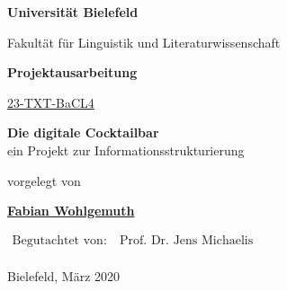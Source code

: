 \begin{center}

\Huge{\textbf{Universität Bielefeld}}

\LARGE{Fakultät für Linguistik und Literaturwissenschaft}

\vfill

\LARGE{\textbf{Projektausarbeitung}}

\Large

\href{https://ekvv.uni-bielefeld.de/sinfo/publ/modul/26802491}{23-TXT-BaCL4}

\vfill


\vspace*{1cm}

\LARGE{\textbf{Die digitale Cocktailbar}\\ein Projekt zur Informationsstrukturierung}

\Large

\vfill

vorgelegt von

\vspace*{1cm}

\textbf{\href{https://www.fabianwohlgemuth.de}{Fabian Wohlgemuth}}

\vfill

$\begin{aligned}
\text{Begutachtet von:}&\ \text{Prof. Dr. Jens Michaelis}\\
\end{aligned}$

\vfill

Bielefeld, März 2020

\end{center}
\restoregeometry